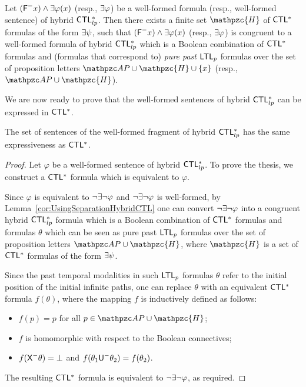 \begin{lemma}\label{cor:UsingSeparationHybridCTL} Let $(\textsf{F}^{-} x)\wedge \exists \varphi(x)$ (resp., $\exists\varphi$) be a well-formed formula (resp., well-formed sentence) of hybrid $\text{\sffamily CTL$^{*}_{lp}$}$.  Then there exists a finite set $\mathpzc{H}$ of $\text{\sffamily CTL$^{*}$}$ formulas of the form $\exists\psi$, such that $(\textsf{F}^{-} x)\wedge \exists \varphi(x)$ (resp., $\exists\varphi$) is congruent to a well-formed formula of hybrid $\text{\sffamily CTL$^{*}_{lp}$}$ which is a Boolean combination of $\text{\sffamily CTL$^{*}$}$ formulas and (formulas that
correspond to) \emph{pure past}  $\text{\sffamily LTL$_p$}$ formulas over the set of proposition letters $\Prop\cup  \mathpzc{H} \cup \{x\}$ (resp., $\Prop\cup  \mathpzc{H}$).
\end{lemma} 

We are now ready to prove that the well-formed sentences of hybrid $\text{\sffamily CTL$^{*}_{lp}$}$ can be expressed in $\text{\sffamily CTL$^{*}$}$.

\begin{theorem}\label{Theo:HybridCTLInfiniteCase} 
The set of sentences of the well-formed fragment of hybrid $\text{\sffamily CTL$^{*}_{lp}$}$ has the same expressiveness as $\text{\sffamily CTL$^{*}$}$.
\end{theorem}
\begin{proof}
Let $\varphi$ be a well-formed sentence of hybrid $\text{\sffamily CTL$^{*}_{lp}$}$. To prove the thesis,  we construct a $\text{\sffamily CTL$^{*}$}$ formula which is equivalent to $\varphi$. 

Since $\varphi$ is equivalent to $\neg \exists \neg \varphi$ and $\neg \exists \neg \varphi$ is well-formed, by  Lemma~\ref{cor:UsingSeparationHybridCTL} one can convert  $\neg \exists \neg \varphi$ into a congruent hybrid $\text{\sffamily CTL$^{*}_{lp}$}$ formula which is a Boolean combination of $\text{\sffamily CTL$^{*}$}$ formulas and formulas $\theta$ which can be seen as pure past $\text{\sffamily LTL$_p$}$ formulas over the set of proposition letters $\Prop\cup  \mathpzc{H}$, where $\mathpzc{H}$ is a set of $\text{\sffamily CTL$^{*}$}$ formulas of the form $\exists\psi$. 

Since the past temporal modalities
in such  $\text{\sffamily LTL$_p$}$ formulas $\theta$ refer to the initial position of the initial infinite paths, one can replace $\theta$ with an equivalent $\text{\sffamily CTL$^{*}$}$ formula $f(\theta)$, where the mapping $f$ is inductively defined as follows:
 \begin{itemize}
   \item $f(p)=p$ for all $p\in \Prop\cup  \mathpzc{H}$;
   \item $f$ is homomorphic with respect to the Boolean connectives;
   \item $f(\textsf{X}^{-}\theta)=\bot$ and $f(\theta_1\textsf{U}^{-}\theta_2)=f(\theta_2)$.
 \end{itemize}
The resulting $\text{\sffamily CTL$^{*}$}$ formula is equivalent to $\neg \exists \neg \varphi$, as required.
\end{proof}

